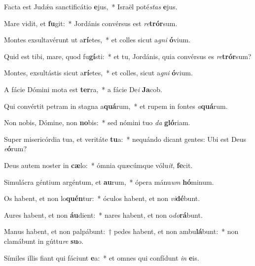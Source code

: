 \item Facta est Judǽa sanctificátio \textbf{e}jus,~* Israël poté\textit{stas} \textbf{e}jus.

\item Mare vidit, et \textbf{fu}git:~* Jordánis convérsus est \textit{re}\textbf{trór}sum.

\item Montes exsultavérunt ut a\textbf{rí}etes,~* et colles sicut a\textit{gni} \textbf{ó}vium.

\item Quid est tibi, mare, quod fu\textbf{gí}sti:~* et tu, Jordánis, quia convérsus es \textit{re}\textbf{trór}sum?

\item Montes, exsultástis sicut a\textbf{rí}etes,~* et colles, sicut a\textit{gni} \textbf{ó}vium.

\item A fácie Dómini mota est \textbf{ter}ra,~* a fácie De\textit{i} \textbf{Ja}cob.

\item Qui convértit petram in stagna a\textbf{quá}rum,~* et rupem in fontes \textit{a}\textbf{quá}rum.

\item Non nobis, Dómine, non \textbf{no}bis:~* sed nómini tuo \textit{da} \textbf{gló}riam.

\item Super misericórdia tua, et veritáte \textbf{tu}a:~* nequándo dicant gentes: Ubi est Deus \textit{e}\textbf{ó}rum?

\item Deus autem noster in \textbf{cæ}lo:~* ómnia quæcúmque vólu\textit{it}, \textbf{fe}cit.

\item Simulácra géntium argéntum, et \textbf{au}rum,~* ópera mánu\textit{um} \textbf{hó}minum.

\item Os habent, et non lo\textbf{quén}tur:~* óculos habent, et non \textit{vi}\textbf{dé}bunt.

\item Aures habent, et non \textbf{áu}dient:~* nares habent, et non o\textit{do}\textbf{rá}bunt.

\item Manus habent, et non palpábunt:~† pedes habent, et non ambu\textbf{lá}bunt:~* non clamábunt in gúttu\textit{re} \textbf{su}o.

\item Símiles illis fiant qui fáciunt \textbf{e}a:~* et omnes qui confídunt \textit{in} \textbf{e}is.

